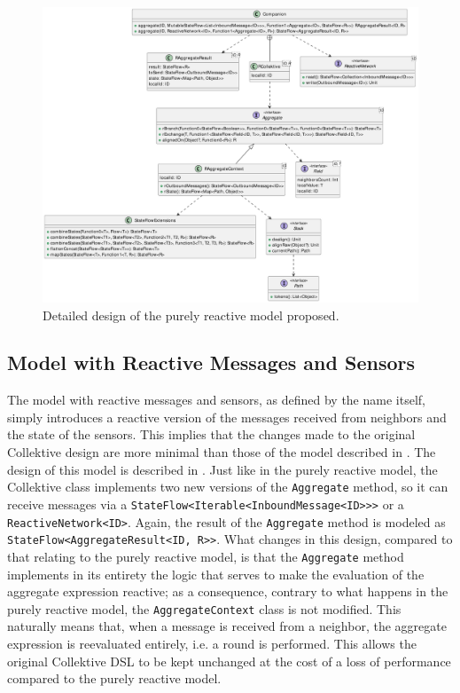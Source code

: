 \begin{figure}
    \centering
    \includegraphics[width=\linewidth]{figures/collektive-prm-design.pdf}
    \caption{Detailed design of the purely reactive model proposed.}
    \label{fig:collektive-prm-design}
\end{figure}

\subsection{Model with Reactive Messages and Sensors}

The model with reactive messages and sensors, as defined by the name itself, simply introduces a reactive version of the messages received from neighbors and the state of the sensors. This implies that the changes made to the original Collektive design are more minimal than those of the model described in . The design of this model is described in . Just like in the purely reactive model, the Collektive class implements two new versions of the \texttt{Aggregate} method, so it can receive messages via a \texttt{StateFlow<Iterable<InboundMessage<ID>>>} or a \texttt{ReactiveNetwork<ID>}. Again, the result of the \texttt{Aggregate} method is modeled as \texttt{StateFlow<AggregateResult<ID, R>>}. What changes in this design, compared to that relating to the purely reactive model, is that the \texttt{Aggregate} method implements in its entirety the logic that serves to make the evaluation of the aggregate expression reactive; as a consequence, contrary to what happens in the purely reactive model, the \texttt{AggregateContext} class is not modified. This naturally means that, when a message is received from a neighbor, the aggregate expression is reevaluated entirely, i.e. a round is performed. This allows the original Collektive DSL to be kept unchanged at the cost of a loss of performance compared to the purely reactive model.

